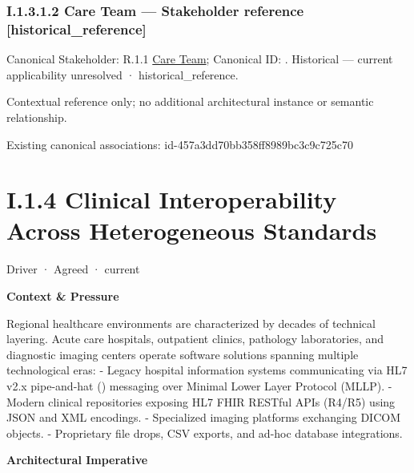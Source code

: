 \subsubsection*{I.1.3.1.2 Care Team — Stakeholder reference [historical\_reference]}
\label{navigation:I.1.3.1.2}

{\small Canonical Stakeholder: R.1.1 \hyperref[element:6f5a203d81e24a81b384a80781987daa]{Care Team}; Canonical ID: \texttt{}. Historical — current applicability unresolved · historical\_reference.}\par
Contextual reference only; no additional architectural instance or semantic relationship.\par
Existing canonical associations: id-457a3dd70bb358ff8989bc3c9c725c70\par
\section*{I.1.4 Clinical Interoperability Across Heterogeneous Standards}
\label{navigation:I.1.4}

\label{element:921d7cf84d2b4abca0deb0d300fa75ea}
{\small Driver · Agreed · current}\par

\par\medskip\textbf{Context \& Pressure}\par


Regional healthcare environments are characterized by decades of technical layering. Acute care hospitals, outpatient clinics, pathology laboratories, and diagnostic imaging centers operate software solutions spanning multiple technological eras:
- Legacy hospital information systems communicating via HL7 v2.x pipe-and-hat (\texttt{}) messaging over Minimal Lower Layer Protocol (MLLP).
- Modern clinical repositories exposing HL7 FHIR RESTful APIs (R4/R5) using JSON and XML encodings.
- Specialized imaging platforms exchanging DICOM objects.
- Proprietary file drops, CSV exports, and ad-hoc database integrations.



\par\medskip\textbf{Architectural Imperative}\par


